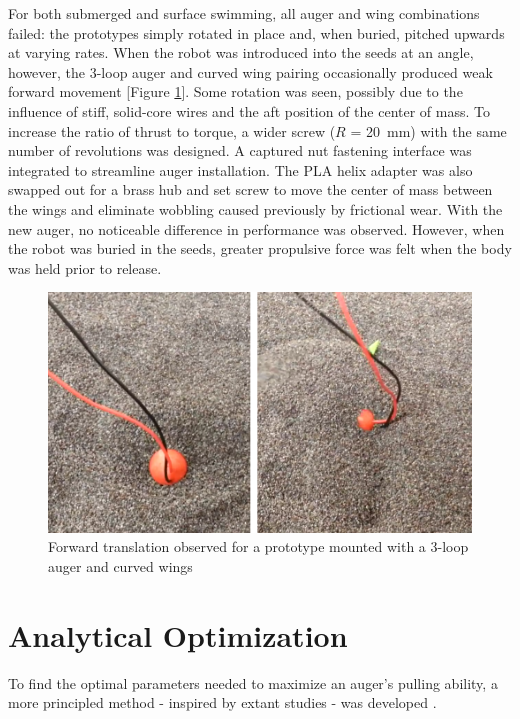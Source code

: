 \documentclass[letterpaper, 11 pt]{article}
\begin{document}
For both submerged and surface swimming, all auger and wing combinations failed: the prototypes simply rotated in place and, when buried, pitched upwards at varying rates. When the robot was introduced into the seeds at an angle, however, the 3-loop auger and curved wing pairing occasionally produced weak forward movement [Figure \ref{fig:t1_success}]. Some rotation was seen, possibly due to the influence of stiff, solid-core wires and the aft position of the center of mass. To increase the ratio of thrust to torque, a wider screw ($R$ = \SI{20}{\milli\m}) with the same number of revolutions was designed. A captured nut fastening interface was integrated to streamline auger installation. The PLA helix adapter was also swapped out for a brass hub and set screw to move the center of mass between the wings and eliminate wobbling caused previously by frictional wear. 
With the new auger, no noticeable difference in performance was observed. However, when the robot was buried in the seeds, greater propulsive force was felt when the body was held prior to release.   

\begin{figure}[H]
\centering
\includegraphics[width=0.7\linewidth]{./imgs/t1_success}
\caption{Forward translation observed for a prototype mounted with a 3-loop auger and curved wings}
\label{fig:t1_success}
\end{figure}

\section{Analytical Optimization}
To find the optimal parameters needed to maximize an auger's pulling ability, a more principled method - inspired by extant studies - was developed \cite{Melo,Li}.
\end{document}
